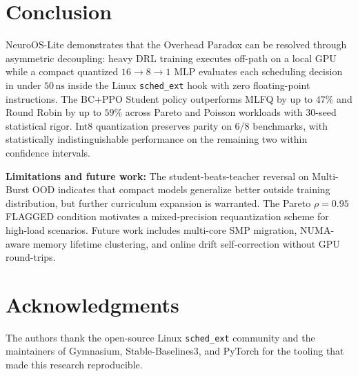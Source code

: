 \section{Conclusion}
\label{sec:conclusion}

NeuroOS-Lite demonstrates that the Overhead Paradox can be resolved through
asymmetric decoupling: heavy DRL training executes off-path on a local GPU
while a compact quantized $16\to 8\to 1$ MLP evaluates each scheduling
decision in under $50\,\text{ns}$ inside the Linux \texttt{sched\_ext}
hook with zero floating-point instructions. The BC+PPO Student policy
outperforms MLFQ by up to $47\%$ and Round Robin by up to $59\%$ across
Pareto and Poisson workloads with 30-seed statistical rigor. Int8
quantization preserves parity on 6/8 benchmarks, with statistically
indistinguishable performance on the remaining two within confidence intervals.

\textbf{Limitations and future work:}
The student-beats-teacher reversal on Multi-Burst OOD indicates that compact
models generalize better outside training distribution, but further curriculum
expansion is warranted. The Pareto $\rho = 0.95$ FLAGGED condition motivates
a mixed-precision requantization scheme for high-load scenarios. Future work
includes multi-core SMP migration, NUMA-aware memory lifetime clustering, and
online drift self-correction without GPU round-trips.

\section*{Acknowledgments}
The authors thank the open-source Linux \texttt{sched\_ext} community and the
maintainers of Gymnasium, Stable-Baselines3, and PyTorch for the tooling that
made this research reproducible.





